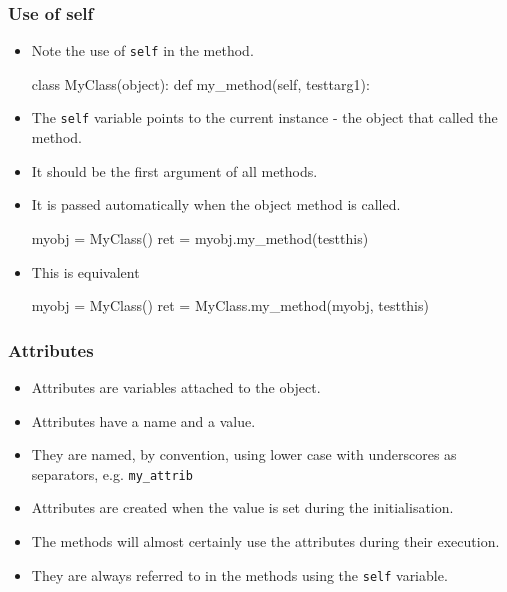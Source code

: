 \documentclass{beamer}
\begin{document}
\begin{frame}[fragile]
\frametitle{Use of self}
\begin{itemize}
\item Note the use of \lstinline|self| in the method.
\begin{code}
class MyClass(object):
  def my_method(self, testtarg1):
\end{code}
\item The \lstinline|self| variable points to the current instance - 
the object that called the method.
\item It should be the first argument of all methods.
\item It is passed automatically when the object method is called.
\begin{code}
myobj = MyClass()
ret = myobj.my_method(testthis)
\end{code}
\item This is equivalent
\begin{code}
myobj = MyClass()
ret = MyClass.my_method(myobj, testthis)
\end{code}
\end{itemize}

\end{frame}

\begin{frame}[fragile]
\frametitle{Attributes}

\begin{itemize}
\item Attributes are variables attached to the object.
\item Attributes have a name and a value.
\item They are named, by convention, using lower case with underscores as separators, 
e.g. \lstinline|my_attrib|
\item Attributes are created when the value is set during the initialisation.
\item The methods will almost certainly use the attributes during their execution.
\item They are always referred to in the methods using the \lstinline|self| variable.
\end{itemize}
%
\end{frame}
\end{document}
